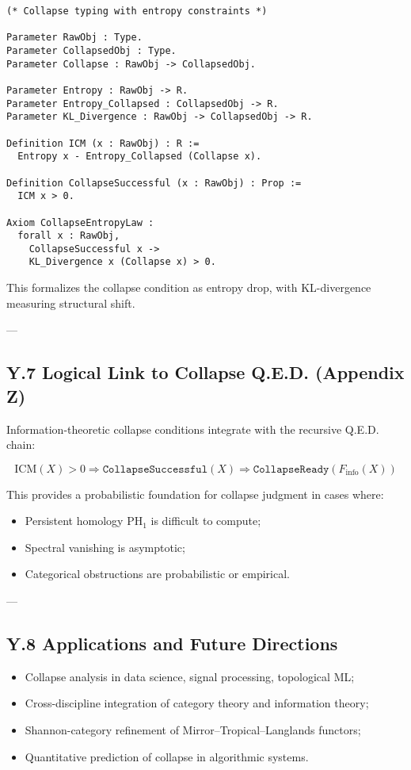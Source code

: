 \documentclass[11pt]{article}
\begin{document}
\begin{lstlisting}[language=Coq, mathescape=false]
(* Collapse typing with entropy constraints *)

Parameter RawObj : Type.
Parameter CollapsedObj : Type.
Parameter Collapse : RawObj -> CollapsedObj.

Parameter Entropy : RawObj -> R.
Parameter Entropy_Collapsed : CollapsedObj -> R.
Parameter KL_Divergence : RawObj -> CollapsedObj -> R.

Definition ICM (x : RawObj) : R :=
  Entropy x - Entropy_Collapsed (Collapse x).

Definition CollapseSuccessful (x : RawObj) : Prop :=
  ICM x > 0.

Axiom CollapseEntropyLaw :
  forall x : RawObj,
    CollapseSuccessful x ->
    KL_Divergence x (Collapse x) > 0.
\end{lstlisting}

This formalizes the collapse condition as entropy drop, with KL-divergence measuring structural shift.

---

\subsection*{Y.7 Logical Link to Collapse Q.E.D. (Appendix Z)}

Information-theoretic collapse conditions integrate with the recursive Q.E.D. chain:

\[
\mathrm{ICM}(X) > 0 \Rightarrow \texttt{CollapseSuccessful}(X) \Rightarrow \texttt{CollapseReady}(F_{\mathrm{info}}(X))
\]

This provides a probabilistic foundation for collapse judgment in cases where:

\begin{itemize}
    \item Persistent homology \( \mathrm{PH}_1 \) is difficult to compute;
    \item Spectral vanishing is asymptotic;
    \item Categorical obstructions are probabilistic or empirical.
\end{itemize}

---

\subsection*{Y.8 Applications and Future Directions}

\begin{itemize}
    \item Collapse analysis in data science, signal processing, topological ML;
    \item Cross-discipline integration of category theory and information theory;
    \item Shannon-category refinement of Mirror–Tropical–Langlands functors;
    \item Quantitative prediction of collapse in algorithmic systems.
\end{itemize}
\end{document}
